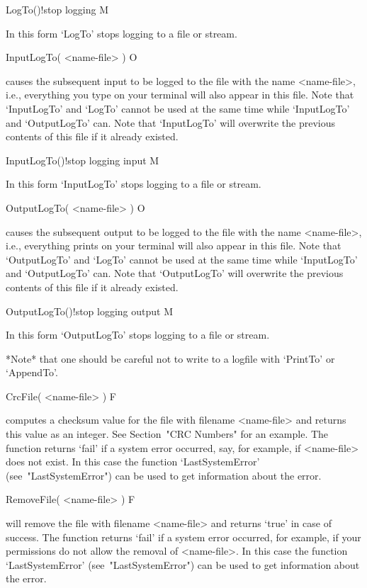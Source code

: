 \>LogTo()!{stop logging} M

In this form `LogTo' stops logging to a file or stream.

\>InputLogTo( <name-file> ) O

causes the  subsequent  input to be   logged to the   file with  the name
<name-file>, i.e., everything you type  on your terminal will also appear
in this file.  Note that `InputLogTo'  and `LogTo' cannot  be used at the
same time while `InputLogTo' and `OutputLogTo' can.
Note  that   `InputLogTo'  will overwrite the   previous
contents of this file if it already existed.

\>InputLogTo()!{stop logging input} M

In this form `InputLogTo' stops logging to a file or stream.

\>OutputLogTo( <name-file> ) O

causes   the subsequent output to   be logged to  the file  with the name
<name-file>,  i.e., everything {\GAP} prints  on  your terminal will also
appear in this file.  Note that  `OutputLogTo' and `LogTo' cannot be used
at the same time while `InputLogTo' and `OutputLogTo' can.
Note  that   `OutputLogTo'  will overwrite the   previous
contents of this file if it already existed.

\>OutputLogTo()!{stop logging output} M

In this form `OutputLogTo' stops logging to a file or stream.

*Note* that one should be careful not to write to a logfile with
`PrintTo' or `AppendTo'.

\>CrcFile( <name-file> ) F

computes  a checksum  value for the  file  with filename <name-file>  and
returns this value  as an integer. See Section~"CRC Numbers" for an example.
The function returns  `fail' if a  system
error occurred, say, for example, if <name-file> does not exist.
In this case the function `LastSystemError' (see~"LastSystemError")
can be used to get information about the error.

\>RemoveFile( <name-file> ) F

will remove the file with filename <name-file> and returns `true' in case
of  success.  The function returns `fail' if a system error occurred, for
example, if your permissions do not allow the removal of <name-file>.
In this case the function `LastSystemError' (see~"LastSystemError")
can be used to get information about the error.

